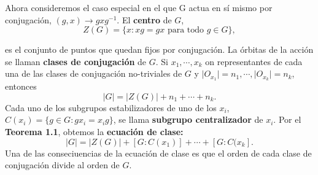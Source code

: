\documentclass{article}
\newcounter{Teorema}
\numberwithin{equation}{section}
\theoremstyle{plain}  %
\providecommand{\abs}[1]{\lvert#1\rvert} %
\begin{document}
Ahora consideremos el caso especial en el que G actua en sí mismo por conjugación, $(g,x) \to gxg^{-1}$. El \textbf{centro} de $G$, 
\begin{equation*}
    Z(G) = \{ x : xg = gx \text{ para todo } g \in G\},
\end{equation*}

es el conjunto de puntos que quedan fijos por conjugación. La órbitas de la acción se llaman \textbf{clases de conjugación} de $G$. Si $x_{1},\cdots,x_{k}$ on representantes de cada una de las clases de conjugación no-triviales de $G$ y $\abs{O_{x_{1}}}= n_{1}, \cdots , \abs{O_{x_{k}}} = n_{k}$, entonces
\begin{equation*}
    \abs{G} = \abs{Z(G)} + n_{1} + \cdots + n_{k}.
\end{equation*}
Cada uno de los subgrupos estabilizadores de uno de los $x_{i}$, $C(x_{i}) = \{g \in G : gx_{i} = x_{i}g\}$, se llama \textbf{subgrupo centralizador} de $x_{i}$. Por el \textbf{Teorema 1.1}, obtemos la \textbf{ecuación de clase:} 
\begin{equation*}
    \abs{G} = \abs{Z(G)} + [G:C(x_{1})] + \cdots + [G:C(x_{k}].
\end{equation*}
Una de las conseciuencias de la ecuación de clase es que el orden de cada clase de conjugación divide al orden de $G$.
\end{document}
